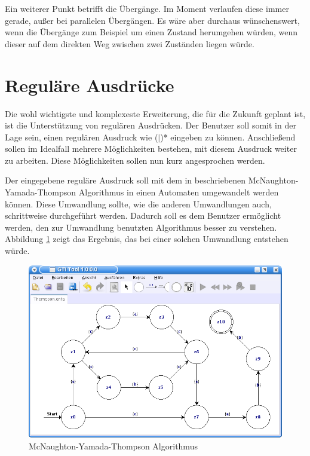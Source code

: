 Ein weiterer Punkt betrifft die Übergänge. Im Moment verlaufen diese immer
gerade, außer bei parallelen Übergängen. Es wäre aber durchaus wünschenswert,
wenn die Übergänge zum Beispiel um einen Zustand herumgehen würden, wenn dieser
auf dem direkten Weg zwischen zwei Zuständen liegen würde.\vspace{10pt}


\section{Reguläre Ausdrücke}

Die wohl wichtigste und komplexeste Erweiterung, die für die Zukunft geplant
ist, ist die Unterstützung von regulären Ausdrücken. Der Benutzer soll somit in
der Lage sein, einen regulären Ausdruck wie
($\mid$)* eingeben zu können.
Anschließend sollen im Idealfall mehrere Möglichkeiten bestehen, mit diesem
Ausdruck weiter zu arbeiten. Diese Möglichkeiten sollen nun kurz angesprochen
werden.\vspace{10pt}

Der eingegebene reguläre Ausdruck soll mit dem in \cite[S.159ff]{Compilers}
beschriebenen McNaughton-Yamada-Thompson Algorithmus in einen Automaten
umgewandelt werden können. Diese Umwandlung sollte, wie die anderen Umwandlungen
auch, schrittweise durchgeführt werden. Dadurch soll es dem Benutzer ermöglicht
werden, den zur Umwandlung benutzten Algorithmus besser zu verstehen. Abbildung
\ref{FigureThompson} zeigt das Ergebnis, das bei einer solchen Umwandlung
entstehen würde.\vspace{10pt}

\begin{figure}[h!]
\begin{center}
\includegraphics[width=12cm]{../images/thompson.png}
\caption{McNaughton-Yamada-Thompson Algorithmus}
\label{FigureThompson}
\end{center}
\end{figure}
\vspace{10pt}

